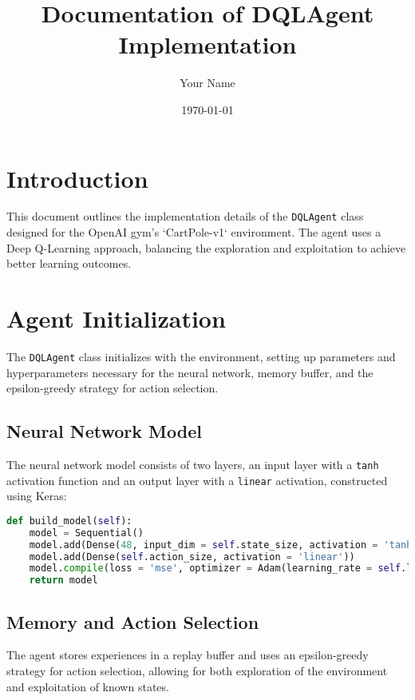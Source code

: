\documentclass{article}
\title{Documentation of DQLAgent Implementation}
\author{Your Name}
\date{\today}
\begin{document}
\maketitle

\section{Introduction}

This document outlines the implementation details of the \texttt{DQLAgent} class designed for the OpenAI gym's `CartPole-v1` environment. The agent uses a Deep Q-Learning approach, balancing the exploration and exploitation to achieve better learning outcomes.

\section{Agent Initialization}

The \texttt{DQLAgent} class initializes with the environment, setting up parameters and hyperparameters necessary for the neural network, memory buffer, and the epsilon-greedy strategy for action selection.

\subsection{Neural Network Model}

The neural network model consists of two layers, an input layer with a \texttt{tanh} activation function and an output layer with a \texttt{linear} activation, constructed using Keras:

\begin{lstlisting}[language=Python]
def build_model(self):
    model = Sequential()
    model.add(Dense(48, input_dim = self.state_size, activation = 'tanh'))
    model.add(Dense(self.action_size, activation = 'linear'))
    model.compile(loss = 'mse', optimizer = Adam(learning_rate = self.learning_rate))
    return model
\end{lstlisting}

\subsection{Memory and Action Selection}

The agent stores experiences in a replay buffer and uses an epsilon-greedy strategy for action selection, allowing for both exploration of the environment and exploitation of known states.
\end{document}
